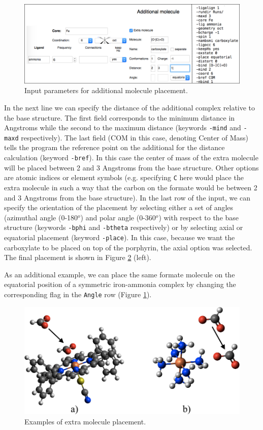 \documentclass[a4paper,12pt]{assignment}
\begin{document}
\begin{figure}[htb!]
\centering
\includegraphics[width=\textwidth]{./Figures/fig7a.png}
\caption{Input parameters for additional molecule placement.}
\label{ex1b}
\end{figure}
In the next line we can specify the distance of the additional complex relative to the base structure. The first field corresponds to the minimum distance in Angstroms while the second to the maximum distance (keywords \texttt{-mind} and \texttt{-maxd} respectively). The last field (COM in this case, denoting Center of Mass) tells the program the reference point on the additional for the distance calculation (keyword \texttt{-bref}). In this case the center of mass of the extra molecule will be placed between 2 and 3 Angstroms from the base structure. Other options are atomic indices or element symbols (e.g. specifying \texttt{C} here would place the extra molecule in such a way that the carbon on the formate would be between 2 and 3 Angstroms from the base structure). In the last row of the input, we can specify the orientation of the placement by selecting either a set of angles (azimuthal angle (0-180$^o$) and polar angle (0-360$^o$) with respect to the base structure (keywords \texttt{-bphi} and \texttt{-btheta} respectively) or by selecting axial or equatorial placement (keyword \texttt{-place}). In this case, because we want the carboxylate to be placed on top of the porphyrin, the axial option was selected. The final placement is shown in Figure \ref{ex1c} (left).

As an additional example, we can place the same formate molecule on the equatorial position of a symmetric iron-ammonia complex by changing the corresponding flag in the \texttt{Angle} row (Figure \ref{ex1b}).

\begin{figure}[htb!]
\centering
\includegraphics[width=\textwidth]{./Figures/fig7b.png}
\caption{Examples of extra molecule placement.}
\label{ex1c}
\end{figure}
\end{document}
